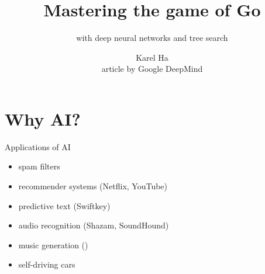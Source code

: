 \documentclass{beamer}
\title{Mastering the game of Go}
\subtitle{with deep neural networks and tree search}
\date{}                         %
\author{Karel Ha \\ article by Google DeepMind}
\institute{Spring School of Combinatorics 2016}
\begin{document}
  {
    \maketitle
  }


  \section{Why AI?}

  \begin{frame}{Applications of AI}
    \begin{itemize}[<+- | alert@+>]
      \item spam filters
      \item recommender systems (Netflix, YouTube)
      \item predictive text (Swiftkey)
      \item audio recognition (Shazam, SoundHound)
      \item music generation (\cite{DeepHear})
      \item self-driving cars
    \end{itemize}
  \end{frame}
\end{document}

